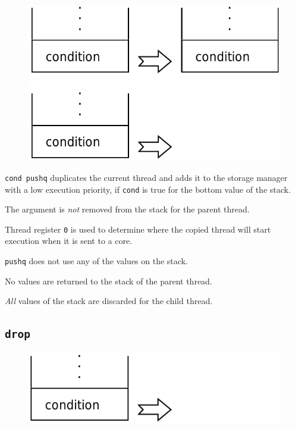 		\begin{figure}
			\begin{flushright}
				\includegraphics[width=\linewidth]{figure/pdf/i_push} 
			\end{flushright}
		\end{figure}
	
			\texttt{cond pushq} duplicates the current thread and adds it to the
			storage manager with a low execution priority, if \texttt{cond} is
			true for the bottom value of the stack.

			The argument is \emph{not} removed from the stack for the parent 
			thread.

			Thread register \texttt{0} is used to determine where the copied
			thread will start execution when it is sent to a core.

			\texttt{pushq} does not use any of the values on the stack.
			
			No values are returned to the stack of the parent thread.

			\emph{All} values of the stack are discarded for the child thread.
	
	\qquad

	\subsection*{\texttt{drop}}
	
		\begin{figure}
			\begin{flushright}
				\includegraphics[width=\linewidth]{figure/pdf/i_drop} 
			\end{flushright}
		\end{figure}
	
